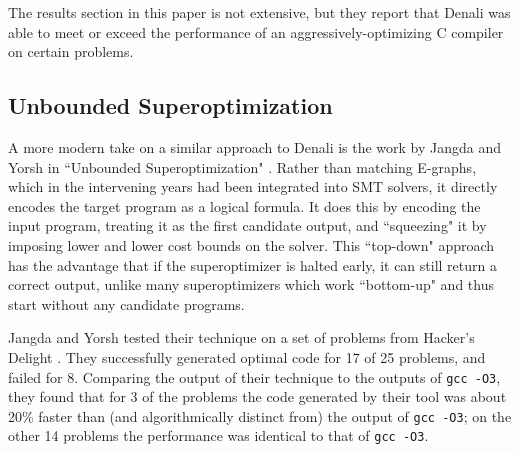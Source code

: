 \documentclass[12pt,twoside]{reedthesis}
\newcommand{\addressed}[2]{{#1}}
\begin{document}
            The results section in this paper is not extensive, but they report that Denali was able to meet or exceed the performance of an aggressively-optimizing C compiler on certain problems.

        \subsection{Unbounded Superoptimization}
            A more modern take on a similar approach to Denali is the work by Jangda and Yorsh in ``Unbounded Superoptimization" \cite{jangda2017unbounded}.
            Rather than matching E-graphs, which in the intervening years had been integrated into SMT solvers, it directly encodes the target program as a logical formula.
            It does this by encoding the input program, treating it as the first candidate output, and
                \addressed{``squeezing" it by imposing lower and lower cost bounds on the solver}{I would make this a bit more explicit--how exactly are computational bounds encoded and how does the tool decide what bounds to use?}.
            This ``top-down" approach has the advantage that if the superoptimizer is halted early, it can still return a correct output, unlike many superoptimizers which work ``bottom-up" and thus start without any candidate programs.
            
            Jangda and Yorsh tested their technique on a set of problems from Hacker's Delight \cite{warren2013hackers}.
            They successfully generated optimal code for 17 of 25 problems, and failed for 8.
            Comparing the output of their technique to the outputs of \texttt{gcc -O3}\footnotemark, they found that for 3 of the problems the code generated by their tool was about 20\% faster than (and algorithmically distinct from) the output of \texttt{gcc -O3}; on the other 14 problems the performance was identical to that of \texttt{gcc -O3}.
            
\end{document}
